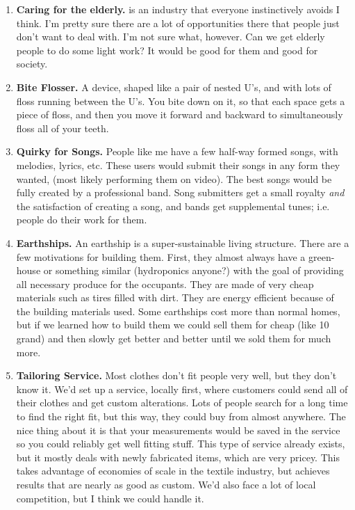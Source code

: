 \documentclass[paper=a4, fontsize=11pt]{scrartcl} %
\numberwithin{equation}{section} %
\numberwithin{figure}{section} %
\numberwithin{table}{section} %
\begin{document}
\begin{enumerate}

\item \textbf{Caring for the elderly.} is an industry that everyone instinctively avoids I think.  I'm pretty sure there are a lot of opportunities there that people just don't want to deal with.  I'm not sure what, however.  Can we get elderly people to do some light work?  It would be good for them and good for society.

\item \textbf{Bite Flosser.}  A device, shaped like a pair of nested U's, and with lots of floss running between the U's.  You bite down on it, so that each space gets a piece of floss, and then you move it forward and backward to simultaneously floss all of your teeth.

\item \textbf{Quirky for Songs.}  People like me have a few half-way formed songs, with melodies, lyrics, etc.  These users would submit their songs in any form they wanted, (most likely performing them on video).  The best songs would be fully created by a professional band.  Song submitters get a small royalty \textit{and} the satisfaction of creating a song, and bands get supplemental tunes; i.e. people do their work for them.
  
\item \textbf{Earthships.}  An earthship is a super-sustainable living structure.  There are a few motivations for building them.  First, they almost always have a green-house or something similar (hydroponics anyone?) with the goal of providing all necessary produce for the occupants.  They are made of very cheap materials such as tires filled with dirt.  They are energy efficient because of the building materials used.  Some earthships cost more than normal homes, but if we learned how to build them we could sell them for cheap (like 10 grand) and then slowly get better and better until we sold them for much more.

\item \textbf{Tailoring Service.}  Most clothes don't fit people very well, but they don't know it.  We'd set up a service, locally first, where customers could send all of their clothes and get custom alterations.  Lots of people search for a long time to find the right fit, but this way, they could buy from almost anywhere.  The nice thing about it is that your measurements would be saved in the service so you could reliably get well fitting stuff.  This type of service already exists, but it mostly deals with newly fabricated items, which are very pricey.  This takes advantage of economies of scale in the textile industry, but achieves results that are nearly as good as custom.  We'd also face a lot of local competition, but I think we could handle it.


\end{enumerate}
\end{document}
